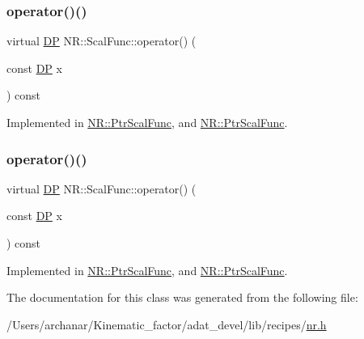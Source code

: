 \subsubsection{\texorpdfstring{operator()()}{operator()()}\hspace{0.1cm}{\footnotesize\ttfamily [1/2]}}
{\footnotesize\ttfamily virtual \mbox{\hyperlink{namespaceNR_af6ff762dd605ff477b8e52387253a02a}{DP}} N\+R\+::\+Scal\+Func\+::operator() (\begin{DoxyParamCaption}\item[{const \mbox{\hyperlink{namespaceNR_af6ff762dd605ff477b8e52387253a02a}{DP}}}]{x }\end{DoxyParamCaption}) const\hspace{0.3cm}{\ttfamily [pure virtual]}}



Implemented in \mbox{\hyperlink{classNR_1_1PtrScalFunc_a661b2194b67e1e0e0de15389f0cea5f1}{N\+R\+::\+Ptr\+Scal\+Func}}, and \mbox{\hyperlink{classNR_1_1PtrScalFunc_a661b2194b67e1e0e0de15389f0cea5f1}{N\+R\+::\+Ptr\+Scal\+Func}}.

\mbox{\label{classNR_1_1ScalFunc_a7dae30ac413c03bb0acfae13b7abb57e}} 
\subsubsection{\texorpdfstring{operator()()}{operator()()}\hspace{0.1cm}{\footnotesize\ttfamily [2/2]}}
{\footnotesize\ttfamily virtual \mbox{\hyperlink{namespaceNR_af6ff762dd605ff477b8e52387253a02a}{DP}} N\+R\+::\+Scal\+Func\+::operator() (\begin{DoxyParamCaption}\item[{const \mbox{\hyperlink{namespaceNR_af6ff762dd605ff477b8e52387253a02a}{DP}}}]{x }\end{DoxyParamCaption}) const\hspace{0.3cm}{\ttfamily [pure virtual]}}



Implemented in \mbox{\hyperlink{classNR_1_1PtrScalFunc_a661b2194b67e1e0e0de15389f0cea5f1}{N\+R\+::\+Ptr\+Scal\+Func}}, and \mbox{\hyperlink{classNR_1_1PtrScalFunc_a661b2194b67e1e0e0de15389f0cea5f1}{N\+R\+::\+Ptr\+Scal\+Func}}.



The documentation for this class was generated from the following file\+:\begin{DoxyCompactItemize}
\item 
/\+Users/archanar/\+Kinematic\+\_\+factor/adat\+\_\+devel/lib/recipes/\mbox{\hyperlink{lib_2recipes_2nr_8h}{nr.\+h}}\end{DoxyCompactItemize}
